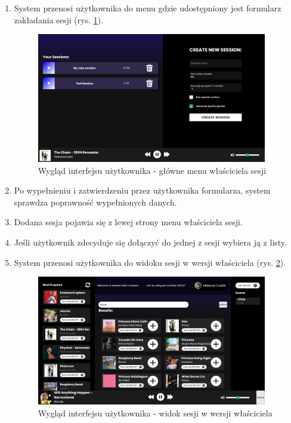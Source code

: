 \begin{enumerate}
\item System przenosi użytkownika do menu gdzie udostępniony jest formularz zakładania sesji (rys. \ref{fig:admin-menu}).
\begin{figure}[h]
\centering
\includegraphics[width=0.95\textwidth]{./graf/admin_menu.png}
\caption{Wygląd interfejsu użytkownika - główne menu właściciela sesji}
\label{fig:admin-menu}
\end{figure}

\item Po wypełnieniu i zatwierdzeniu przez użytkownika formularza, system sprawdza poprawność wypełnionych danych.
\item Dodana sesja pojawia się z lewej strony menu właściciela sesji.
\item Jeśli użytkownik zdecyduje się dołączyć do jednej z sesji wybiera ją z listy.
\item System przenosi użytkownika do widoku sesji w wersji właściciela (rys. \ref{fig:session-menu-owner}).
\begin{figure}[h]
\centering
\includegraphics[width=0.95\textwidth]{./graf/admin_session_menu.png}
\caption{Wygląd interfejsu użytkownika - widok sesji w wersji właściciela}
\label{fig:session-menu-owner}
\end{figure}
\end{enumerate}

